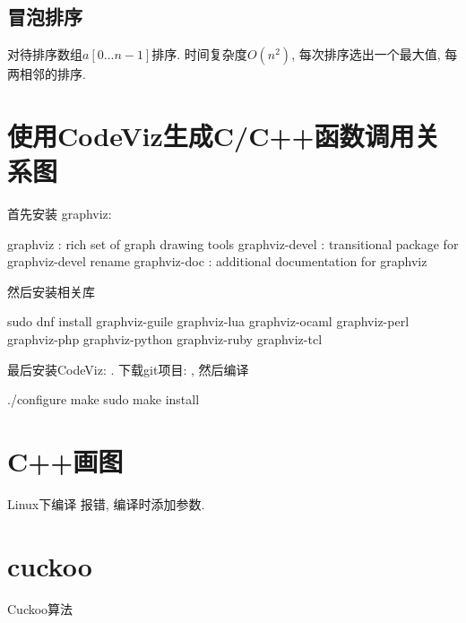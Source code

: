 \subsection{冒泡排序}
对待排序数组$a[0...n-1]$排序.
时间复杂度$O(n^2)$, 每次排序选出一个最大值, 每两相邻的排序.

\section{使用CodeViz生成C/C++函数调用关系图}
首先安装 graphviz: 

\begin{shell}
 graphviz : rich set of graph drawing tools
 graphviz-devel : transitional package for graphviz-devel rename
 graphviz-doc : additional documentation for graphviz
\end{shell}
然后安装相关库
\begin{shell}
sudo dnf install graphviz-guile graphviz-lua graphviz-ocaml graphviz-perl graphviz-php graphviz-python graphviz-ruby graphviz-tcl
\end{shell}
最后安装CodeViz: . 下载git项目: , 
然后编译
\begin{shell}
 ./configure
 make
 sudo make install
\end{shell}


\newpage
\section{C++画图}
Linux下编译
报错, 
编译时添加参数.

\newpage
\section{cuckoo}
Cuckoo算法

\newpage